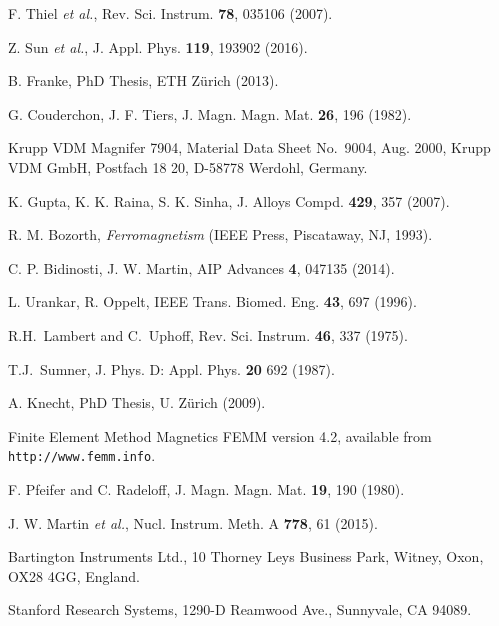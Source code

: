 \documentclass[review]{elsarticle}
\begin{document}
\begin{thebibliography}{00}
 F. Thiel {\it et al.}, Rev. Sci. Instrum. {\bf 78}, 035106 (2007).

 Z. Sun {\it et al.}, J. Appl. Phys. {\bf
  119}, 193902 (2016).

 B. Franke, PhD Thesis, ETH Z\"urich (2013).

 G. Couderchon, J. F. Tiers,
  J. Magn. Magn. Mat. {\bf 26}, 196 (1982).

 Krupp VDM Magnifer 7904, Material Data Sheet
  No.~9004, Aug. 2000, Krupp VDM GmbH, Postfach 18 20, D-58778
  Werdohl, Germany.

 K. Gupta, K. K. Raina, S. K. Sinha, J. Alloys
  Compd. {\bf 429}, 357 (2007).

 R. M. Bozorth, {\it Ferromagnetism} (IEEE Press,
  Piscataway, NJ, 1993).

 C. P. Bidinosti, J. W. Martin, AIP Advances
  {\bf 4}, 047135 (2014).

 L. Urankar, R. Oppelt, IEEE
  Trans. Biomed. Eng. {\bf 43}, 697 (1996).

 R.H.\ Lambert and C.\ Uphoff, Rev. Sci. Instrum. {\bf 46},  337 (1975).

 T.J.\ Sumner,  J. Phys. D: Appl. Phys. {\bf 20} 692 (1987).

 A. Knecht, PhD Thesis, U. Z\"urich (2009).

 Finite Element Method Magnetics FEMM version 4.2,
  available from {\tt http://www.femm.info}.





 F. Pfeifer and C. Radeloff,
  J. Magn. Magn. Mat. {\bf 19}, 190 (1980).

 J. W. Martin {\it et al.},
  Nucl. Instrum. Meth. A {\bf 778}, 61 (2015).

 Bartington Instruments Ltd., 10 Thorney Leys
  Business Park, Witney, Oxon, OX28 4GG, England.

 Stanford Research Systems, 1290-D Reamwood Ave.,
  Sunnyvale, CA 94089.


\end{thebibliography}
\end{document}
